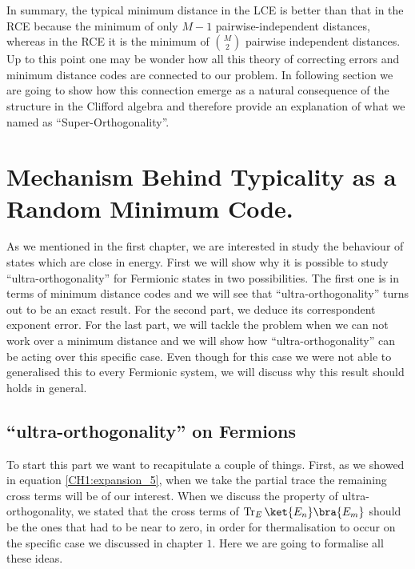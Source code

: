 \indent In summary, the typical minimum distance in the LCE is better than that in the RCE because the minimum of only $M-1$ pairwise-independent distances, whereas in the RCE it is the minimum of ${M\choose 2}$ pairwise independent distances.\\

\indent Up to this point one may be wonder how all this theory of correcting errors and minimum distance codes are connected to our problem. In following section we are going to show how this connection emerge as a natural consequence of the structure in the Clifford algebra and therefore provide an explanation of what we named as ``Super-Orthogonality''.
\section{Mechanism Behind Typicality as a Random Minimum Code.}
As we mentioned in the first chapter, we are interested in study the behaviour of states which are close in energy. First we will show why it is possible to study ``ultra-orthogonality'' for Fermionic states in two possibilities. The first one is in terms of minimum distance codes and we will see that ``ultra-orthogonality'' turns out to be an exact result. For the second part, we deduce its correspondent exponent error. For the last part, we will tackle the problem when we can not work over a minimum distance and we will show how ``ultra-orthogonality'' can be acting over this specific case. Even though for this case we were not able to generalised this to every Fermionic system, we will discuss why this result should holds in general.

\subsection{``ultra-orthogonality'' on Fermions}
To start this part we want to recapitulate a couple of things. First, as we showed in equation \eqref{CH1:expansion_5}, when we take the partial trace the remaining cross terms  will be of our interest. When we discuss the property of ultra-orthogonality, we stated that the cross terms of $\operatorname{Tr}_{E}\ket{E_n}\bra{E_m}$ should be the ones that had to be near to zero, in order for thermalisation to occur on the specific case we discussed in chapter $1$. Here we are going to formalise all these ideas.\\

